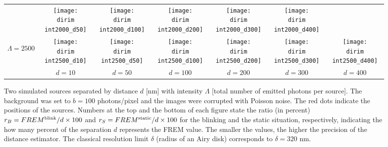 \begin{figure}[!bt]
\begin{tabular}{c|cccccc}
		&\texttt{[image: \\dirim int2000\_d50]}
		&\texttt{[image: \\dirim int2000\_d100]}
		&\texttt{[image: \\dirim int2000\_d200]}
		&\texttt{[image: \\dirim int2000\_d300]}
		&\texttt{[image: \\dirim int2000\_d400]}\\
		\begin{sideways}\hspace{\vs cm}$\Lambda=2500$\end{sideways}
		&\texttt{[image: \\dirim int2500\_d10]}
		&\texttt{[image: \\dirim int2500\_d50]}
		&\texttt{[image: \\dirim int2500\_d100]}
		&\texttt{[image: \\dirim int2500\_d200]}
		&\texttt{[image: \\dirim int2500\_d300]}
		&\texttt{[image: \\dirim int2500\_d400]}\\		
		\hline	
		&$d=10$ & $d=50$ & $d=100$ & $d=200$ & $d=300$ & $d=400$\\
	\end{tabular}
	\caption{Two simulated sources separated by distance $d$ [nm] with intensity $\Lambda$ [total number of emitted photons per source]. The background was set to $b=100$ photons/pixel and the images were corrupted with Poisson noise. The red dots indicate the positions of the sources. Numbers at the top and the bottom of each figure state the ratio (in percent) $r_B=FREM^{\textrm{blink}}/d\times 100$ and $r_S=FREM^{\textrm{static}}/d\times 100$ for the blinking and the static situation, respectively, indicating the how many percent of the separation $d$ represents the FREM value. The smaller the values, the higher the precision of the distance estimator. The classical resolution limit $\delta$ (radius of an Airy disk) corresponds to $\delta=320$ nm.}
	\label{fig:two sources int d}
\end{figure}
%
